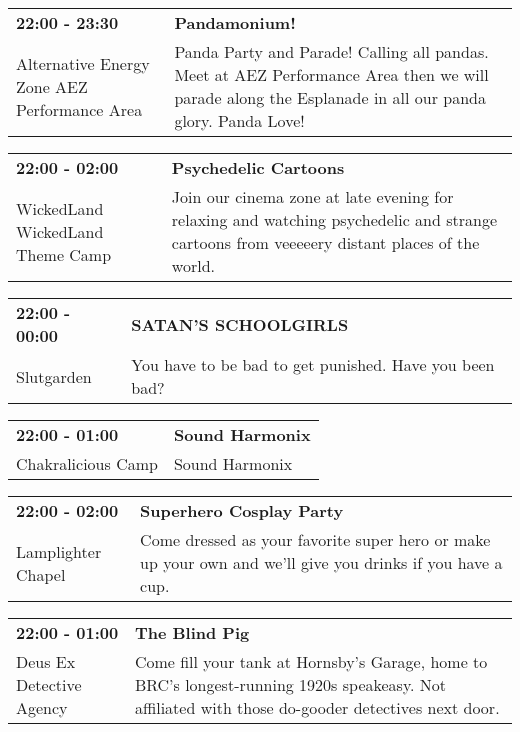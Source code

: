 \begin{tabular}{ p{1in} p{2.2in} }
    \textbf{22:00 - 23:30} & \textbf{Pandamonium!} \\
    Alternative Energy Zone \newline AEZ Performance Area & Panda Party and Parade! Calling all pandas. Meet at AEZ Performance Area then we will parade along the Esplanade in all our panda glory.  Panda Love! \\
    \hline 
\end{tabular}
    
\begin{tabular}{ p{1in} p{2.2in} }
    \textbf{22:00 - 02:00} & \textbf{Psychedelic Cartoons} \\
    WickedLand \newline WickedLand Theme Camp & Join our cinema zone at late evening for relaxing and watching psychedelic and strange cartoons from veeeeery distant places of the world. \\
    \hline 
\end{tabular}
    
\begin{tabular}{ p{1in} p{2.2in} }
    \textbf{22:00 - 00:00} & \textbf{SATAN'S SCHOOLGIRLS} \\
    Slutgarden \newline  & You have to be bad to get punished. Have you been bad? \\
    \hline 
\end{tabular}
    
\begin{tabular}{ p{1in} p{2.2in} }
    \textbf{22:00 - 01:00} & \textbf{Sound Harmonix} \\
    Chakralicious Camp \newline  & Sound Harmonix \\
    \hline 
\end{tabular}
    
\begin{tabular}{ p{1in} p{2.2in} }
    \textbf{22:00 - 02:00} & \textbf{Superhero Cosplay Party} \\
    Lamplighter Chapel \newline  & Come dressed as your favorite super hero or make up your own and we'll give you drinks if you have a cup. \\
    \hline 
\end{tabular}
    
\begin{tabular}{ p{1in} p{2.2in} }
    \textbf{22:00 - 01:00} & \textbf{The Blind Pig} \\
    Deus Ex Detective Agency \newline  & Come fill your tank at Hornsby's Garage, home to BRC's longest-running 1920s speakeasy. Not affiliated with those do-gooder detectives next door. \\
    \hline 
\end{tabular}
    
